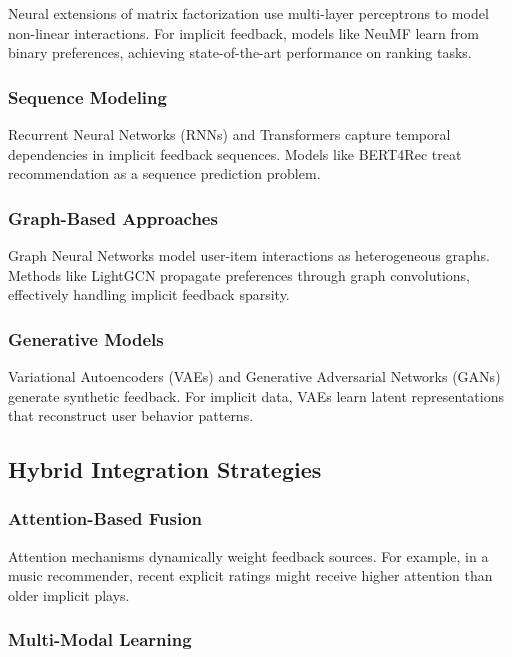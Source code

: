Neural extensions of matrix factorization use multi-layer perceptrons to model non-linear interactions. For implicit feedback, models like NeuMF \cite{he2017neural} learn from binary preferences, achieving state-of-the-art performance on ranking tasks.

\subsubsection{Sequence Modeling}

Recurrent Neural Networks (RNNs) and Transformers capture temporal dependencies in implicit feedback sequences. Models like BERT4Rec \cite{sun2019bert4rec} treat recommendation as a sequence prediction problem.

\subsubsection{Graph-Based Approaches}

Graph Neural Networks model user-item interactions as heterogeneous graphs. Methods like LightGCN \cite{he2020lightgcn} propagate preferences through graph convolutions, effectively handling implicit feedback sparsity.

\subsubsection{Generative Models}

Variational Autoencoders (VAEs) and Generative Adversarial Networks (GANs) generate synthetic feedback. For implicit data, VAEs learn latent representations that reconstruct user behavior patterns.

\subsection{Hybrid Integration Strategies}

\subsubsection{Attention-Based Fusion}

Attention mechanisms dynamically weight feedback sources. For example, in a music recommender, recent explicit ratings might receive higher attention than older implicit plays.

\subsubsection{Multi-Modal Learning}

